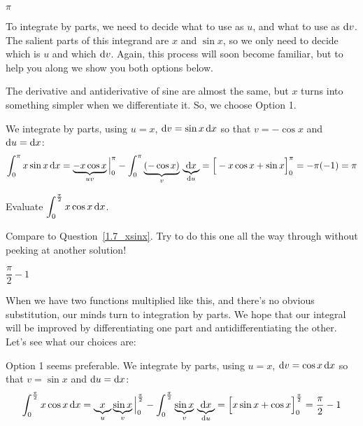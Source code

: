 \begin{answer}
$\pi$
\end{answer}

\begin{solution}
To integrate by parts, we need to decide what to use as $u$, and what to use as $\mathrm{d}v$. The salient parts of this integrand are $x$ and $\sin x$, so we only need to decide which is $u$ and which $\mathrm{d}v$. Again, this process will soon become familiar, but to help you along we show you both options below.


The derivative and antiderivative of sine are almost the same, but $x$ turns into something simpler when we differentiate it. So, we choose Option 1.

We integrate by parts, using $u = x$, $\mathrm{d}v =\sin x \,\mathrm{d}x$
so that $v=-\cos x$ and $\mathrm{d}u = \mathrm{d}x$:
\begin{align*}
\int_0^\pi x\sin x\,\mathrm{d}x
   = \underbrace{-x\cos x}_{uv} \Big|_0^\pi -\int_0^\pi \underbrace{(-\cos x)}_v\,\underbrace{\mathrm{d}x}_{\mathrm{d}u}
   = \Big[-x\cos x +\sin x\Big]_0^\pi
   =-\pi(-1)
   =\pi
\end{align*}
\end{solution}

\begin{question}[M105 2015A]
Evaluate $\displaystyle\int_0^{\frac{\pi}{2}} x\cos x\,\mathrm{d}x$.
\end{question}

\begin{hint}
Compare to Question~\ref{1.7_xsinx}. Try to do this one all the way through without peeking at another solution!
\end{hint}

\begin{answer}
$\dfrac{\pi}{2} -1$
\end{answer}

\begin{solution}
When we have two functions multiplied like this, and there's no obvious substitution, our minds turn to integration by parts. We hope that our integral will be improved by differentiating one part and antidifferentiating the other. Let's see what our choices are:


Option 1 seems preferable. We integrate by parts, using $u = x$, $\mathrm{d}v =\cos x \,\mathrm{d}x$
so that $v=\sin x$ and $\mathrm{d}u = \mathrm{d}x$:
\begin{align*}
\int_0^{\frac{\pi}{2}} x\cos x\,\mathrm{d}x
   = \underbrace{x}_u\underbrace{\sin x}_v \Big|_0^{\frac{\pi}{2}} -\int_0^{\frac{\pi}{2}} \underbrace{\sin x}_v\,\underbrace{\mathrm{d}x}_{\mathrm{d}u}
   = \Big[x\sin x +\cos x\Big]_0^{\frac{\pi}{2}}
   =\frac{\pi}{2} - 1
\end{align*}
\end{solution}

